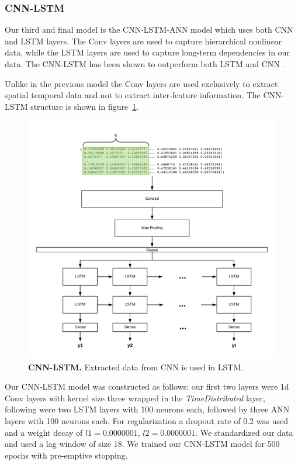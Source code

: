 \documentclass[12pt,journal,compsoc]{IEEEtran}
\begin{document}
\subsubsection{CNN-LSTM}
\par Our third and final model is the CNN-LSTM-ANN model which uses both CNN and LSTM layers. The Conv layers are used to capture hierarchical nonlinear data, while the LSTM layers are used to capture long-term dependencies in our data. The CNN-LSTM has been shown to outperform both LSTM and CNN~\cite{carbon}.
\par Unlike in the previous model the Conv layers are used exclusively to extract spatial temporal data and not to extract inter-feature information.
The CNN-LSTM structure is shown in figure~\ref{fig:cnn_lstm-def}.
\begin{figure}[H]\centering
	\includegraphics[width=\linewidth]{images/CNN_LSTM.png}
	\caption{\textbf{CNN-LSTM.} Extracted data from CNN is used in LSTM.}
	\label{fig:cnn_lstm-def}
\end{figure}
\par Our CNN-LSTM model was constructed as follows: our first two layers were 1d Conv layers  with kernel size three wrapped in the \textit{TimeDistributed} layer, following were two LSTM layers with 100 neurons each, followed by three ANN layers with 100 neurons each.
For regularization a dropout rate of 0.2 was used and a weight decay of $l1=0.0000001$, $l2=0.0000001$.
We standardized our data and used a lag window of size 18.
We trained our CNN-LSTM model for 500 epochs with pre-emptive stopping.
\end{document}
